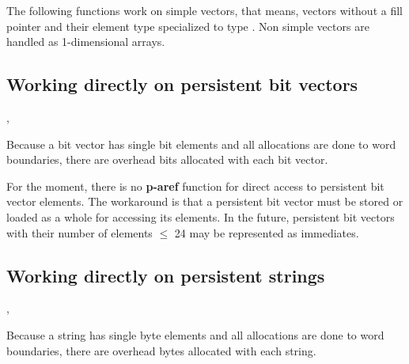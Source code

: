 The following functions work on simple vectors, that means, vectors
without a fill pointer and their element type specialized to type
. Non simple vectors are handled as 1-dimensional arrays.

\begin{NarrowRefList}
\Allocator {}
\TypePredicate {}
\ObjectStore {}
\ObjectLoad {}
\SlotReader {}
\SlotWriter {}
\Information {}
\end{NarrowRefList}

\subsection[Persistent bit vectors]{Working directly on persistent bit
  vectors}

\begin{NarrowRefList}
\Allocator {}
\TypePredicate {}
\ObjectStore {}
\ObjectLoad {}
\Information {},
\end{NarrowRefList}
Because a bit vector has single bit elements and all allocations are
done to word boundaries, there are  overhead bits allocated with each bit
vector.

For the moment, there is no \textbf{p-aref} function for direct access
to persistent bit vector elements. The workaround is that a persistent
bit vector must be stored or loaded as a whole for accessing its
elements. In the future, persistent bit vectors with their number of
elements $\leq$ 24 may be represented as immediates.

\subsection[Persistent strings]{Working directly on persistent
  strings}

\begin{NarrowRefList}
\Allocator {}
\TypePredicate {}
\ObjectStore {}
\ObjectLoad {}
\Information {},
\end{NarrowRefList}
Because a string has single byte elements and all allocations are done
to word boundaries, there are 
overhead bytes allocated with each string.

